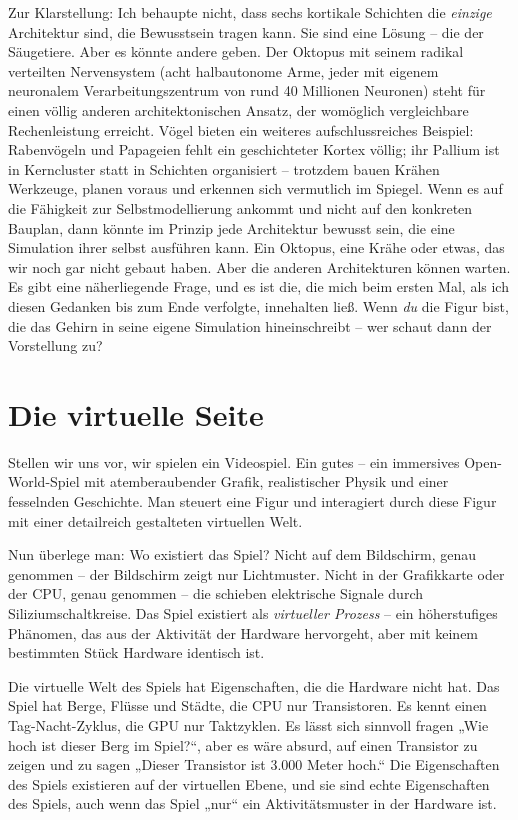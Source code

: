 \documentclass[11pt, twoside, openright]{book}
\begin{document}
Zur Klarstellung: Ich behaupte nicht, dass sechs kortikale Schichten die \textit{einzige} Architektur sind, die Bewusstsein tragen kann. Sie sind eine Lösung -- die der Säugetiere. Aber es könnte andere geben. Der Oktopus mit seinem radikal verteilten Nervensystem (acht halbautonome Arme, jeder mit eigenem neuronalem Verarbeitungszentrum von rund 40 Millionen Neuronen) steht für einen völlig anderen architektonischen Ansatz, der womöglich vergleichbare Rechenleistung erreicht. Vögel bieten ein weiteres aufschlussreiches Beispiel: Rabenvögeln und Papageien fehlt ein geschichteter Kortex völlig; ihr Pallium ist in Kerncluster statt in Schichten organisiert -- trotzdem bauen Krähen Werkzeuge, planen voraus und erkennen sich vermutlich im Spiegel. Wenn es auf die Fähigkeit zur Selbstmodellierung ankommt und nicht auf den konkreten Bauplan, dann könnte im Prinzip jede Architektur bewusst sein, die eine Simulation ihrer selbst ausführen kann. Ein Oktopus, eine Krähe oder etwas, das wir noch gar nicht gebaut haben. Aber die anderen Architekturen können warten. Es gibt eine näherliegende Frage, und es ist die, die mich beim ersten Mal, als ich diesen Gedanken bis zum Ende verfolgte, innehalten ließ. Wenn \textit{du} die Figur bist, die das Gehirn in seine eigene Simulation hineinschreibt -- wer schaut dann der Vorstellung zu?

\chapter{Die virtuelle Seite}

Stellen wir uns vor, wir spielen ein Videospiel. Ein gutes -- ein immersives Open-World-Spiel mit atemberaubender Grafik, realistischer Physik und einer fesselnden Geschichte. Man steuert eine Figur und interagiert durch diese Figur mit einer detailreich gestalteten virtuellen Welt.

Nun überlege man: Wo existiert das Spiel? Nicht auf dem Bildschirm, genau genommen -- der Bildschirm zeigt nur Lichtmuster. Nicht in der Grafikkarte oder der CPU, genau genommen -- die schieben elektrische Signale durch Siliziumschaltkreise. Das Spiel existiert als \textit{virtueller Prozess} -- ein höherstufiges Phänomen, das aus der Aktivität der Hardware hervorgeht, aber mit keinem bestimmten Stück Hardware identisch ist.

Die virtuelle Welt des Spiels hat Eigenschaften, die die Hardware nicht hat. Das Spiel hat Berge, Flüsse und Städte, die CPU nur Transistoren. Es kennt einen Tag-Nacht-Zyklus, die GPU nur Taktzyklen. Es lässt sich sinnvoll fragen „Wie hoch ist dieser Berg im Spiel?“, aber es wäre absurd, auf einen Transistor zu zeigen und zu sagen „Dieser Transistor ist 3.000 Meter hoch.“ Die Eigenschaften des Spiels existieren auf der virtuellen Ebene, und sie sind echte Eigenschaften des Spiels, auch wenn das Spiel „nur“ ein Aktivitätsmuster in der Hardware ist.
\end{document}
